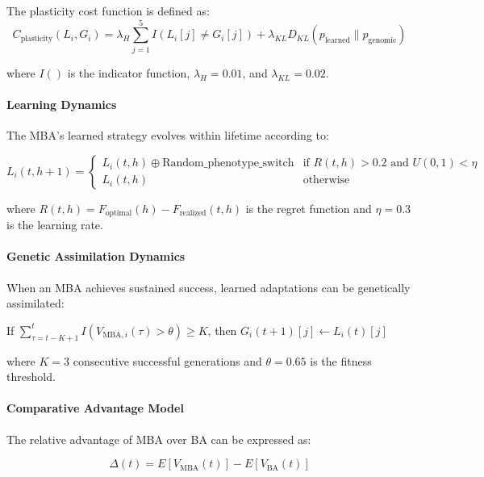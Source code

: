 \documentclass[aps,pre,twocolumn,floatfix,nofootinbib,amsmath,amssymb]{revtex4-2}
\begin{document}
The plasticity cost function is defined as:
\begin{equation}
C_{\text{plasticity}}(L_i, G_i) = \lambda_H \sum_{j=1}^{5} I(L_i[j] \neq G_i[j]) + \lambda_{KL} D_{KL}(p_{\text{learned}} \| p_{\text{genomic}})
\end{equation}

where $I()$ is the indicator function, $\lambda_H = 0.01$, and $\lambda_{KL} = 0.02$.

\paragraph{Learning Dynamics}

The MBA's learned strategy evolves within lifetime according to:

\begin{equation}
L_i(t, h+1) = \begin{cases} 
L_i(t, h) \oplus \text{Random\_phenotype\_switch} & \text{if } R(t,h) > 0.2 \text{ and } U(0,1) < \eta \\ 
L_i(t, h) & \text{otherwise} 
\end{cases}
\end{equation}

where $R(t,h) = F_{\text{optimal}}(h) - F_{\text{realized}}(t,h)$ is the regret function and $\eta = 0.3$ is the learning rate.

\paragraph{Genetic Assimilation Dynamics}

When an MBA achieves sustained success, learned adaptations can be genetically assimilated:

If $\sum_{\tau=t-K+1}^{t} I(V_{\text{MBA},i}(\tau) > \theta) \geq K$, then $G_i(t+1)[j] \leftarrow L_i(t)[j]$

where $K = 3$ consecutive successful generations and $\theta = 0.65$ is the fitness threshold.

\paragraph{Comparative Advantage Model}

The relative advantage of MBA over BA can be expressed as:

\begin{equation}
\Delta(t) = E[V_{\text{MBA}}(t)] - E[V_{\text{BA}}(t)]
\end{equation}
\end{document}
